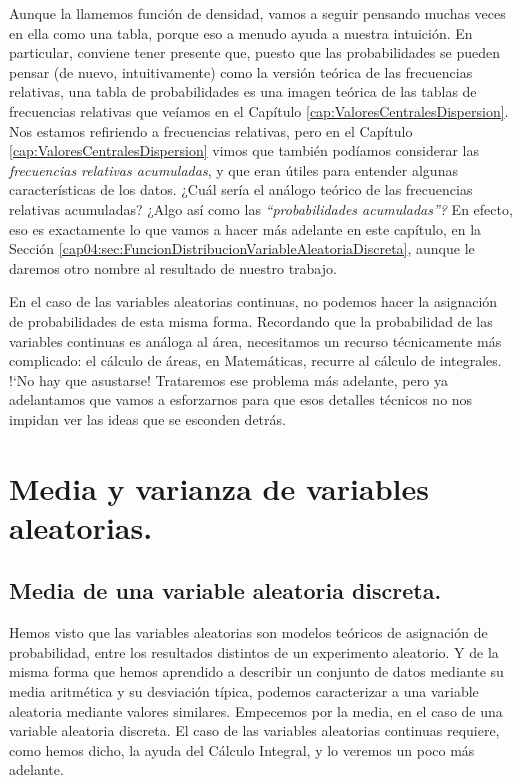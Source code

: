 Aunque la llamemos función de densidad, vamos a seguir pensando muchas veces en ella como una tabla, porque eso a menudo ayuda a nuestra intuición. En particular, conviene tener presente que, puesto que las probabilidades se pueden pensar (de nuevo, intuitivamente) como la versión teórica de las frecuencias relativas, una tabla de probabilidades es una imagen teórica de las tablas de frecuencias relativas que veíamos en el Capítulo \ref{cap:ValoresCentralesDispersion}. Nos estamos refiriendo a frecuencias relativas, pero en el Capítulo \ref{cap:ValoresCentralesDispersion} vimos que también podíamos considerar las {\em frecuencias relativas acumuladas}, y que eran útiles para entender algunas características de los datos. ¿Cuál sería el análogo teórico de las frecuencias relativas acumuladas? ¿Algo así como las {\em ``probabilidades acumuladas''?} En efecto, eso es exactamente lo que vamos a hacer más adelante en este capítulo, en la Sección \ref{cap04:sec:FuncionDistribucionVariableAleatoriaDiscreta}, aunque le daremos otro nombre al resultado de nuestro trabajo.

En el caso de las variables aleatorias continuas, no podemos hacer la asignación de probabilidades de esta misma forma. Recordando que la probabilidad de las variables continuas es análoga al área, necesitamos un recurso técnicamente más complicado: el cálculo de áreas, en Matemáticas, recurre al cálculo de integrales. {!`}No hay que asustarse! Trataremos ese problema más adelante, pero ya  adelantamos que vamos a esforzarnos para que esos detalles técnicos no nos impidan ver las ideas que se esconden detrás.


\section{Media y varianza de variables aleatorias.}\label{cap04:sec:MediaVarianzaVariablesAleatorias}


\subsection{Media de una variable aleatoria discreta.}
\label{cap04:subsec:MediaVariableAleatroriaDiscreta}

Hemos visto que las variables aleatorias son modelos teóricos de asignación de probabilidad, entre los resultados distintos de un experimento aleatorio. Y de la misma forma que hemos aprendido a describir un conjunto de datos mediante su media aritmética y su desviación típica, podemos
caracterizar a una variable aleatoria mediante valores similares. Empecemos por la media, en el caso de una variable aleatoria discreta. El caso de las variables aleatorias continuas requiere, como hemos dicho, la ayuda del Cálculo Integral, y lo veremos un poco más adelante.

